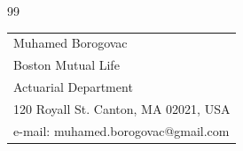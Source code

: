 \documentclass[11pt, reqno]{amsart}
\theoremstyle{plain}
\theoremstyle{remark}
\newcounter{str}
\numberwithin{equation}{section}
\begin{document}
\begin{thebibliography}{99}



\end{thebibliography}



\vspace{.5cm}
\begin{footnotesize}
	\begin{tabular}{l}
Muhamed Borogovac\\
Boston Mutual Life\\
Actuarial Department\\
120 Royall St. Canton, MA 02021, USA\\
e-mail: {muhamed.borogovac@gmail.com }\\
\end{tabular}
\end{footnotesize}
\label{LastPage}
\end{document}

